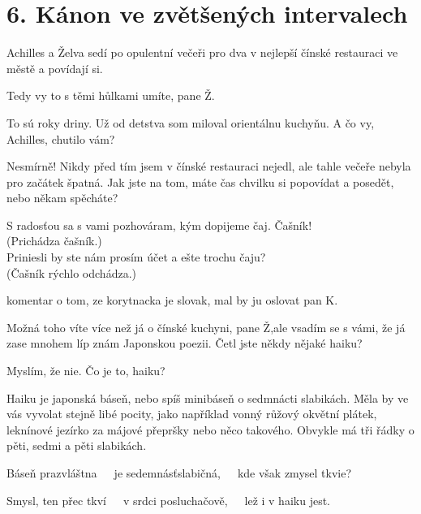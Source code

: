 \documentclass[12pt]{article}
\begin{document}
\section*{6. Kánon ve zvětšených intervalech}
Achilles a Želva sedí po opulentní večeři pro dva v nejlepší čínské restauraci 
    ve městě a povídají si.
\begin{description}[itemsep=0pt]
\item[A:] Tedy vy to s těmi hůlkami umíte, pane Ž.

\item[Ž:] To sú roky driny. Už od detstva som miloval orientálnu kuchyňu. 
    A čo vy, Achilles, chutilo vám?

\item[A:] Nesmírně! Nikdy před tím jsem v čínské restauraci nejedl, ale
    tahle večeře nebyla pro začátek špatná. Jak jste na tom, máte čas chvilku
    si popovídat a posedět, nebo někam spěcháte?

\item[Ž:] S radosťou sa s vami pozhováram, kým dopijeme čaj. Čašník!\\
    (Prichádza čašník.)\\
    Priniesli by ste nám prosím účet a ešte trochu čaju?\\
    (Čašník rýchlo odchádza.)

\item[TODO] komentar o tom, ze korytnacka je slovak, mal by ju oslovat pan K.

\item[A:] Možná toho víte více než já o čínské kuchyni, pane Ž,ale vsadím
    se s vámi, že já zase mnohem líp znám Japonskou poezii. Četl jste někdy
    nějaké haiku?

\item[Ž:] Myslím, že nie. Čo je to, haiku?

\item[A:] Haiku je japonská báseň, nebo spíš minibáseň o sedmnácti slabikách.
    Měla by ve vás vyvolat stejně libé pocity, jako například vonný růžový
    okvětní plátek, leknínové jezírko za májové přepršky nebo něco takového.
    Obvykle má tři řádky o pěti, sedmi a pěti slabikách.

\item[Ž:] Báseň prazvláštna\ \ \ je sedemnásťslabičná,\ \ \ kde však zmysel tkvie?

\item[A:] Smysl, ten přec tkví\ \ \ v srdci posluchačově,\ \ \ lež i v haiku jest.


\end{description}
\end{document}
